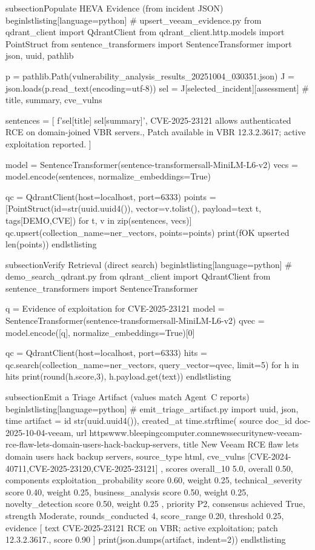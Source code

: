 subsection{Populate HEVA Evidence (from incident JSON)}
begin{lstlisting}[language=python]
# upsert_veeam_evidence.py
from qdrant_client import QdrantClient
from qdrant_client.http.models import PointStruct
from sentence_transformers import SentenceTransformer
import json, uuid, pathlib

p = pathlib.Path(vulnerability_analysis_results_20251004_030351.json)
J = json.loads(p.read_text(encoding=utf-8))
sel = J[selected_incident][assessment]  # title, summary, cve_vulns

sentences = [
f'{sel[title]} {sel[summary]}',
CVE-2025-23121 allows authenticated RCE on domain-joined VBR servers.,
Patch available in VBR 12.3.2.3617; active exploitation reported.
]

model = SentenceTransformer(sentence-transformersall-MiniLM-L6-v2)
vecs = model.encode(sentences, normalize_embeddings=True)

qc = QdrantClient(host=localhost, port=6333)
points = [PointStruct(id=str(uuid.uuid4()), vector=v.tolist(),
payload={text t, tags[DEMO,CVE]}) for t, v in zip(sentences, vecs)]
qc.upsert(collection_name=ner_vectors, points=points)
print(fOK upserted {len(points)})
end{lstlisting}

subsection{Verify Retrieval (direct search)}
begin{lstlisting}[language=python]
# demo_search_qdrant.py
from qdrant_client import QdrantClient
from sentence_transformers import SentenceTransformer

q = Evidence of exploitation for CVE-2025-23121
model = SentenceTransformer(sentence-transformersall-MiniLM-L6-v2)
qvec = model.encode([q], normalize_embeddings=True)[0]

qc = QdrantClient(host=localhost, port=6333)
hits = qc.search(collection_name=ner_vectors, query_vector=qvec, limit=5)
for h in hits
print(round(h.score,3), h.payload.get(text))
end{lstlisting}

subsection{Emit a Triage Artifact (values match Agent~C reports)}
begin{lstlisting}[language=python]
# emit_triage_artifact.py
import uuid, json, time
artifact = {
	id str(uuid.uuid4()),
	created_at time.strftime(%
	source {
		doc_id doc-2025-10-04-veeam,
		url httpswww.bleepingcomputer.comnewssecuritynew-veeam-rce-flaw-lets-domain-users-hack-backup-servers,
		title New Veeam RCE flaw lets domain users hack backup servers,
		source_type html,
		cve_vulns [CVE-2024-40711,CVE-2025-23120,CVE-2025-23121]
	},
	scores {
		overall_10 5.0, overall 0.50,
		components {
			exploitation_probability {score 0.60, weight 0.25},
			technical_severity      {score 0.40, weight 0.25},
			business_analysis       {score 0.50, weight 0.25},
			novelty_detection       {score 0.50, weight 0.25}
		}
	},
	priority P2,
	consensus {achieved True, strength Moderate,
		rounds_conducted 4, score_range 0.20, threshold 0.25},
	evidence [{
		text CVE-2025-23121 RCE on VBR; active exploitation; patch 12.3.2.3617.,
		score 0.90
	}]
}
print(json.dumps(artifact, indent=2))
end{lstlisting}

